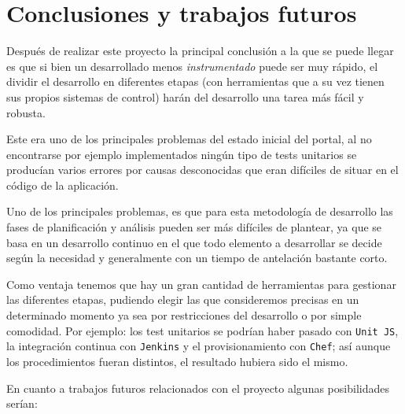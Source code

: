 \chapter{Conclusiones y trabajos futuros}

Después de realizar este proyecto la principal conclusión a la que se puede llegar es que si bien un desarrollado menos \textit{instrumentado} puede ser muy rápido, el dividir el desarrollo en diferentes etapas (con herramientas que a su vez tienen sus propios sistemas de control) harán del desarrollo una tarea más fácil y robusta.

\bigskip
Este era uno de los principales problemas del estado inicial del portal, al no encontrarse por ejemplo implementados ningún tipo de tests unitarios se producían varios errores por causas desconocidas que eran difíciles de situar en el código de la aplicación.

\bigskip
Uno de los principales problemas, es que para esta metodología de desarrollo las fases de planificación y análisis pueden ser más difíciles de plantear, ya que se basa en un desarrollo continuo en el que todo elemento a desarrollar se decide según la necesidad y generalmente con un tiempo de antelación bastante corto.

\bigskip
Como ventaja tenemos que hay un gran cantidad de herramientas para gestionar las diferentes etapas, pudiendo elegir las que consideremos precisas en un determinado momento ya sea por restricciones del desarrollo o por simple comodidad. Por ejemplo: los test unitarios se podrían haber pasado con {\tt Unit JS}, la integración continua con {\tt Jenkins} y el provisionamiento con {\tt Chef}; así aunque los procedimientos fueran distintos, el resultado hubiera sido el mismo.

\newpage
En cuanto a trabajos futuros relacionados con el proyecto algunas posibilidades serían:

